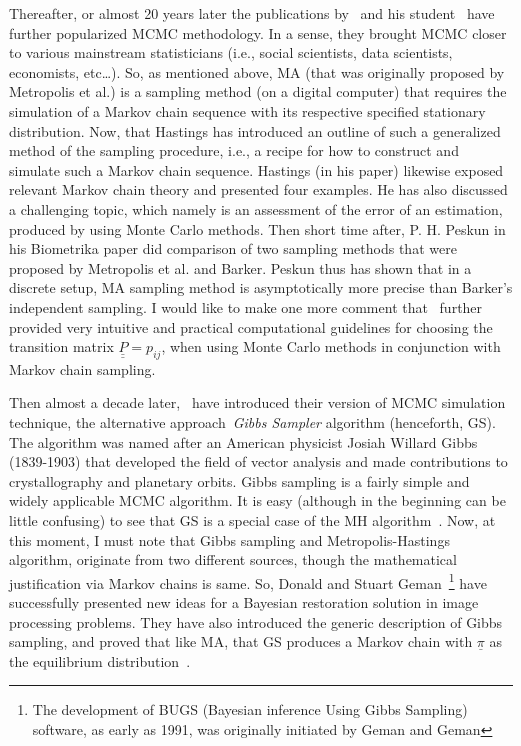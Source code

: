 \documentclass[a4paper,11pt,english]{article}
\begin{document}
        Thereafter, or almost 20 years later the publications by~\citep{hastings} and his student~\citep{peskun} have further popularized MCMC 
        methodology. In a sense, they brought MCMC closer to various mainstream statisticians (i.e., social scientists, data scientists, economists, 
        etc\ldots). So, as mentioned above, MA (that was originally proposed by Metropolis et al.) is a sampling method (on a digital computer) that 
        requires the simulation of a Markov chain sequence with its respective specified stationary distribution. Now, that Hastings has introduced an 
        outline of such a generalized method of the sampling procedure, i.e., a recipe for how to construct and simulate such a Markov chain sequence. 
        Hastings (in his paper) likewise exposed relevant Markov chain theory and presented four examples. He has also discussed a challenging topic, 
        which namely is an assessment of the error of an estimation, produced by using Monte Carlo methods. Then short time after, P. H. Peskun in his 
        Biometrika paper did comparison of two sampling methods that were proposed by Metropolis et al. and Barker. Peskun thus has shown that in a 
        discrete setup, MA sampling method is asymptotically more precise than Barker's independent sampling. I would like to make one more comment 
        that~\citep{peskun81} further provided very intuitive and practical computational guidelines for choosing the transition matrix 
        $\underline{\underline{P}}=p_{ij}$, when using Monte Carlo methods in conjunction with Markov chain sampling.

		Then almost a decade later,~\citep{geman} have introduced their version of MCMC simulation technique, the alternative 
		approach~\textit{Gibbs Sampler} algorithm (henceforth, GS). The algorithm was named after an American physicist Josiah Willard Gibbs (1839-1903) 
		that developed the field of vector analysis and made contributions to crystallography and planetary orbits. Gibbs sampling is a fairly simple and 
		widely applicable MCMC algorithm. It is easy (although in the beginning can be little confusing) to see that GS is a special case of the 
		MH algorithm~\citep[pp.~542-543]{bishop}. Now, at this moment, I must note that Gibbs sampling and Metropolis-Hastings algorithm, originate from 
		two different sources, though the mathematical justification via Markov chains is same. So, Donald and Stuart 
		Geman~\footnote{The development of BUGS (Bayesian inference Using Gibbs Sampling) software, as early as 1991, was originally initiated by Geman 
		and Geman} have successfully presented  new ideas for a Bayesian restoration solution in image processing problems. They have also introduced the 
		generic description of Gibbs sampling, and proved that like MA, that GS produces a Markov chain with $\underline{\pi}$ as the equilibrium 
		distribution~\citep[p.~731]{geman}. 
		
\end{document}
